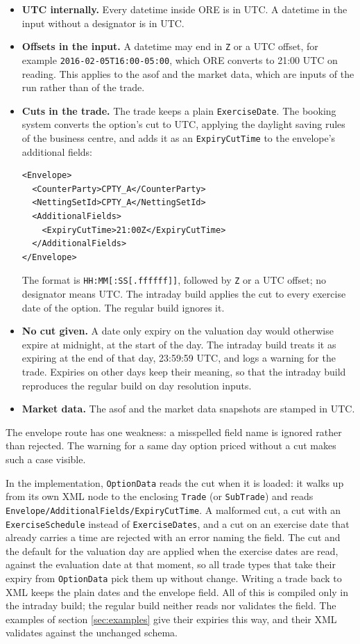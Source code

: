 \documentclass[12pt, a4paper]{article}
\begin{document}
\begin{itemize}
\item \textbf{UTC internally.} Every datetime inside ORE is in UTC. A datetime in the input without a designator is in
  UTC.
\item \textbf{Offsets in the input.} A datetime may end in \texttt{Z} or a UTC offset, for example
  \texttt{2016-02-05T16:00-05:00}, which ORE converts to 21:00 UTC on reading. This applies to the asof and the market
  data, which are inputs of the run rather than of the trade.
\item \textbf{Cuts in the trade.} The trade keeps a plain \texttt{ExerciseDate}. The booking system converts the
  option's cut to UTC, applying the daylight saving rules of the business centre, and adds it as an
  \texttt{ExpiryCutTime} to the envelope's additional fields:
\begin{verbatim}
<Envelope>
  <CounterParty>CPTY_A</CounterParty>
  <NettingSetId>CPTY_A</NettingSetId>
  <AdditionalFields>
    <ExpiryCutTime>21:00Z</ExpiryCutTime>
  </AdditionalFields>
</Envelope>
\end{verbatim}
  The format is \texttt{HH:MM[:SS[.ffffff]]}, followed by \texttt{Z} or a UTC offset; no designator means UTC. The
  intraday build applies the cut to every exercise date of the option. The regular build ignores it.
\item \textbf{No cut given.} A date only expiry on the valuation day would otherwise expire at midnight, at the start of
  the day. The intraday build treats it as expiring at the end of that day, 23:59:59 UTC, and logs a warning for the
  trade. Expiries on other days keep their meaning, so that the intraday build reproduces the regular build on day
  resolution inputs.
\item \textbf{Market data.} The asof and the market data snapshots are stamped in UTC.
\end{itemize}

The envelope route has one weakness: a misspelled field name is ignored rather than rejected. The warning for a same
day option priced without a cut makes such a case visible.

In the implementation, \texttt{OptionData} reads the cut when it is loaded: it walks up from its own XML node to the
enclosing \texttt{Trade} (or \texttt{SubTrade}) and reads \texttt{Envelope/AdditionalFields/ExpiryCutTime}. A
malformed cut, a cut with an \texttt{ExerciseSchedule} instead of \texttt{ExerciseDates}, and a cut on an exercise date
that already carries a time are rejected with an error naming the field. The cut and the default for the valuation day
are applied when the exercise dates are read, against the evaluation date at that moment, so all trade types that take
their expiry from \texttt{OptionData} pick them up without change. Writing a trade back to XML keeps the plain dates and
the envelope field. All of this is compiled only in the intraday build; the regular build neither reads nor validates
the field. The examples of section \ref{sec:examples} give their expiries this way, and their XML validates against
the unchanged schema.
\end{document}

